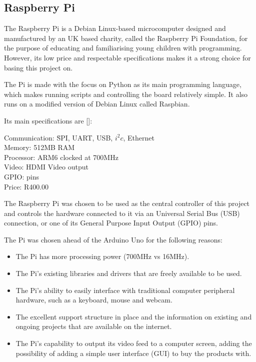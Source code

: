 \subsection{Raspberry Pi}

The Raspberry Pi is a Debian Linux-based microcomputer
designed and manufactured by an UK based charity, called the Raspberry Pi Foundation, for the
purpose of educating and familiarising young children with programming. However, its low price
and respectable specifications makes it a strong choice for basing this project on.

The Pi is made with the focus on Python as its main programming language, which makes running
scripts and controlling the board relatively simple. It also runs on a modified version of
Debian Linux called Raspbian.

Its main specifications are [\cite{website:raspi-specs}]:

\begin{tabbing}

Communication: \= SPI, UART, USB, $i^2c$, Ethernet \\ 
Memory: \> 512MB RAM \\
Processor: \> ARM6 clocked at 700MHz \\
Video: \> HDMI Video output \\
GPIO:  pins \\
Price: \> R400.00 \\

\end{tabbing} 

The Raspberry Pi was chosen to be used as the central controller of this project and
controls the hardware connected to it via an Universal Serial Bus (USB) connection, or one of
its General Purpose Input Output (GPIO) pins.

The Pi was chosen ahead of the Arduino Uno for the following reasons:

\begin{itemize}
  
  \item The Pi has more processing power (700MHz vs 16MHz).
  \item The Pi's existing libraries and drivers that are freely available to be used.
  \item The Pi's ability to easily interface with traditional computer peripheral hardware,
  such as a keyboard, mouse and webcam.
  \item The excellent support structure in place and the information on existing and ongoing
  projects that are available on the internet.
  \item The Pi's capability to output its video feed to a computer screen, adding the
  possibility of adding a simple user interface (GUI) to buy the products with. 

\end{itemize}

